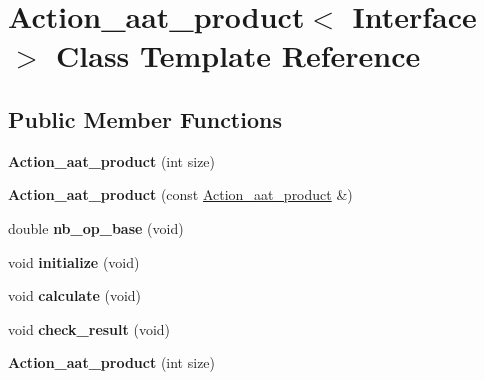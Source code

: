 \hypertarget{class_action__aat__product}{}\section{Action\+\_\+aat\+\_\+product$<$ Interface $>$ Class Template Reference}
\label{class_action__aat__product}
\subsection*{Public Member Functions}
\begin{DoxyCompactItemize}
\item 
\mbox{\label{class_action__aat__product_a3398349ab82756587da76ea2836eecb4}} 
{\bfseries Action\+\_\+aat\+\_\+product} (int size)
\item 
\mbox{\label{class_action__aat__product_a192b758a5e1a5e95f2fa0adb8e72252b}} 
{\bfseries Action\+\_\+aat\+\_\+product} (const \hyperlink{class_action__aat__product}{Action\+\_\+aat\+\_\+product} \&)
\item 
\mbox{\label{class_action__aat__product_a0b040d07f3ba9d13005463eca2ca945a}} 
double {\bfseries nb\+\_\+op\+\_\+base} (void)
\item 
\mbox{\label{class_action__aat__product_a497ef68e00b4ef503131d65769cb412c}} 
void {\bfseries initialize} (void)
\item 
\mbox{\label{class_action__aat__product_ab4b5b71c95f24c9a4ca2cf6cc7315a39}} 
void {\bfseries calculate} (void)
\item 
\mbox{\label{class_action__aat__product_a7edabf4aed91eff88a4aacc6dd077e02}} 
void {\bfseries check\+\_\+result} (void)
\item 
\mbox{\label{class_action__aat__product_a3398349ab82756587da76ea2836eecb4}} 
{\bfseries Action\+\_\+aat\+\_\+product} (int size)
\item 
\mbox{\label{class_action__aat__product_a192b758a5e1a5e95f2fa0adb8e72252b}} 

\end{DoxyCompactItemize}

